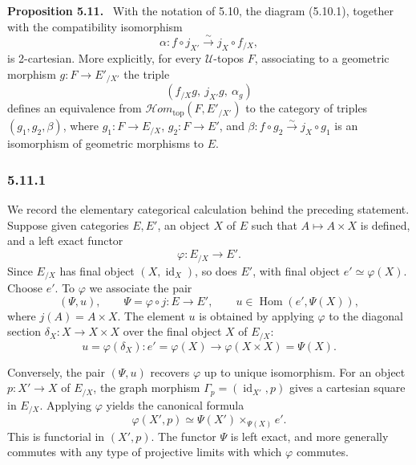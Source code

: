 \documentclass[11pt]{article}
\newcommand{\U}{\mathcal{U}}
\newcommand{\Hom}{\operatorname{Hom}}
\newcommand{\Hhomtop}{\mathcal{H}om_{\mathrm{top}}}
\newenvironment{statement}[1]{\par\medskip\noindent\textbf{#1.}\ }{\par\medskip}
\begin{document}
\begin{statement}{Proposition 5.11}
With the notation of 5.10, the diagram (5.10.1), together with the compatibility isomorphism
\[
\alpha:f\circ j_{X'}\xrightarrow{\sim}j_X\circ f_{/X},
\]
is 2-cartesian. More explicitly, for every \(\U\)-topos \(F\), associating to a geometric morphism \(g:F\to E'_{/X'}\) the triple
\[
(f_{/X}g,\ j_{X'}g,\ \alpha_g)
\]
defines an equivalence from \(\Hhomtop(F,E'_{/X'})\) to the category of triples \((g_1,g_2,\beta)\), where \(g_1:F\to E_{/X}\), \(g_2:F\to E'\), and \(\beta:f\circ g_2\xrightarrow{\sim}j_X\circ g_1\) is an isomorphism of geometric morphisms to \(E\).
\end{statement}

\subsubsection*{5.11.1}
We record the elementary categorical calculation behind the preceding statement. Suppose given categories \(E,E'\), an object \(X\) of \(E\) such that \(A\mapsto A\times X\) is defined, and a left exact functor
\begin{equation*}
\varphi:E_{/X}\longrightarrow E'.\tag{*}
\end{equation*}
Since \(E_{/X}\) has final object \((X,\operatorname{id}_X)\), so does \(E'\), with final object \(e'\simeq\varphi(X)\). Choose \(e'\). To \(\varphi\) we associate the pair
\begin{equation*}
(\Psi,u),\qquad \Psi=\varphi\circ j:E\to E',\qquad u\in\Hom(e',\Psi(X)),\tag{**}
\end{equation*}
where \(j(A)=A\times X\). The element \(u\) is obtained by applying \(\varphi\) to the diagonal section \(\delta_X:X\to X\times X\) over the final object \(X\) of \(E_{/X}\):
\[
u=\varphi(\delta_X):e'=\varphi(X)\longrightarrow \varphi(X\times X)=\Psi(X).
\]

Conversely, the pair \((\Psi,u)\) recovers \(\varphi\) up to unique isomorphism. For an object \(p:X'\to X\) of \(E_{/X}\), the graph morphism \(\Gamma_p=(\operatorname{id}_{X'},p)\) gives a cartesian square in \(E_{/X}\). Applying \(\varphi\) yields the canonical formula
\begin{equation*}
\varphi(X',p)\simeq \Psi(X')\times_{\Psi(X)} e'.\tag{5.11.1.1}
\end{equation*}
This is functorial in \((X',p)\). The functor \(\Psi\) is left exact, and more generally commutes with any type of projective limits with which \(\varphi\) commutes.
\end{document}
